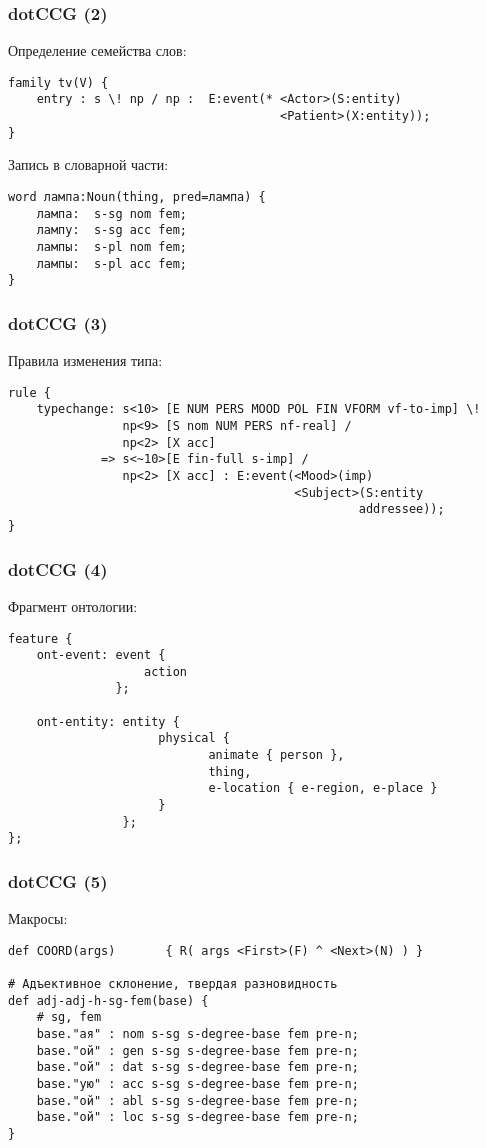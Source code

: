 \documentclass{beamer}
\begin{document}
\begin{frame}[fragile]
\frametitle{dotCCG (2)}
Определение семейства слов:
{\footnotesize \begin{verbatim}
family tv(V) {
    entry : s \! np / np : 	E:event(* <Actor>(S:entity) 
                                      <Patient>(X:entity));
}
\end{verbatim}}
\bigskip
\bigskip
Запись в словарной части:
{\footnotesize \begin{verbatim}
word лампа:Noun(thing, pred=лампа) {
    лампа:  s-sg nom fem;
    лампу:  s-sg acc fem;
    лампы:  s-pl nom fem;
    лампы:  s-pl acc fem;
}
\end{verbatim}}
\end{frame}

\begin{frame}[fragile]
\frametitle{dotCCG (3)}
Правила изменения типа:
{\footnotesize \begin{verbatim}
rule {
    typechange: s<10> [E NUM PERS MOOD POL FIN VFORM vf-to-imp] \! 
                np<9> [S nom NUM PERS nf-real] / 
                np<2> [X acc]
             => s<~10>[E fin-full s-imp] / 
                np<2> [X acc] : E:event(<Mood>(imp) 
                                        <Subject>(S:entity 
                                                 addressee));
}
\end{verbatim}}
\end{frame}

\begin{frame}[fragile]
\frametitle{dotCCG (4)}
Фрагмент онтологии:
{\footnotesize \begin{verbatim}
feature {
    ont-event: event { 
                   action 
               };

    ont-entity: entity {
                     physical {
                            animate { person },
                            thing,
                            e-location { e-region, e-place }
  		             }
  		        };
};  		        
\end{verbatim}}
\end{frame}

\begin{frame}[fragile]
\frametitle{dotCCG (5)}
Макросы:
{\footnotesize \begin{verbatim}
def COORD(args)       { R( args <First>(F) ^ <Next>(N) ) }

# Адъективное склонение, твердая разновидность
def adj-adj-h-sg-fem(base) {
    # sg, fem
    base."ая" : nom s-sg s-degree-base fem pre-n;
    base."ой" : gen s-sg s-degree-base fem pre-n;
    base."ой" : dat s-sg s-degree-base fem pre-n;
    base."ую" : acc s-sg s-degree-base fem pre-n;
    base."ой" : abl s-sg s-degree-base fem pre-n;
    base."ой" : loc s-sg s-degree-base fem pre-n;
}
\end{verbatim}}
\end{frame}
\end{document}
